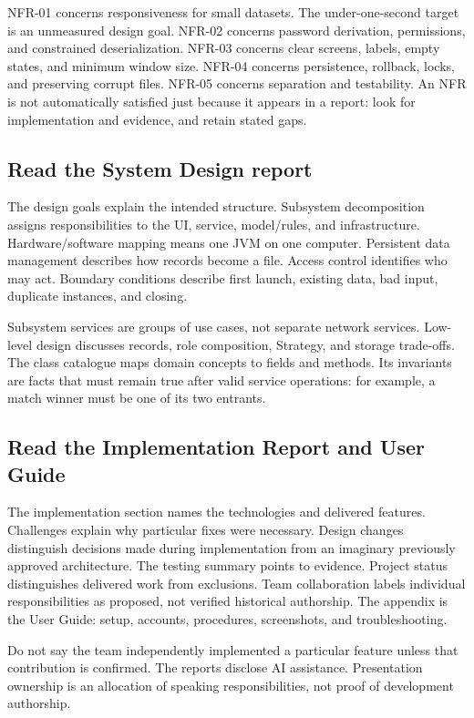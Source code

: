 \documentclass[12pt]{article}
\begin{document}
NFR-01 concerns responsiveness for small datasets. The under-one-second target is an unmeasured design goal. NFR-02 concerns password derivation, permissions, and constrained deserialization. NFR-03 concerns clear screens, labels, empty states, and minimum window size. NFR-04 concerns persistence, rollback, locks, and preserving corrupt files. NFR-05 concerns separation and testability. An NFR is not automatically satisfied just because it appears in a report: look for implementation and evidence, and retain stated gaps.

\subsection{Read the System Design report}
The design goals explain the intended structure. Subsystem decomposition assigns responsibilities to the UI, service, model/rules, and infrastructure. Hardware/software mapping means one JVM on one computer. Persistent data management describes how records become a file. Access control identifies who may act. Boundary conditions describe first launch, existing data, bad input, duplicate instances, and closing.

Subsystem services are groups of use cases, not separate network services. Low-level design discusses records, role composition, Strategy, and storage trade-offs. The class catalogue maps domain concepts to fields and methods. Its invariants are facts that must remain true after valid service operations: for example, a match winner must be one of its two entrants.

\subsection{Read the Implementation Report and User Guide}
The implementation section names the technologies and delivered features. Challenges explain why particular fixes were necessary. Design changes distinguish decisions made during implementation from an imaginary previously approved architecture. The testing summary points to evidence. Project status distinguishes delivered work from exclusions. Team collaboration labels individual responsibilities as proposed, not verified historical authorship. The appendix is the User Guide: setup, accounts, procedures, screenshots, and troubleshooting.

Do not say the team independently implemented a particular feature unless that contribution is confirmed. The reports disclose AI assistance. Presentation ownership is an allocation of speaking responsibilities, not proof of development authorship.
\end{document}
